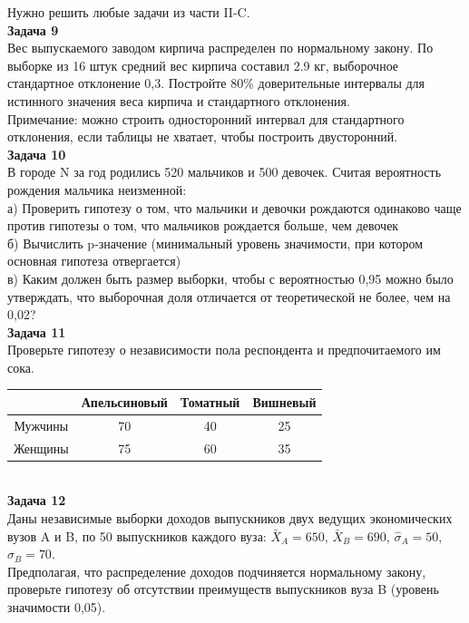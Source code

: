 \documentclass[12pt, a4paper]{article}\usepackage[]{graphicx}\usepackage[]{color}
\begin{document}
Нужно решить любые \textbf{} задачи из части II-C. \\


\textbf{Задача 9} \\
Вес выпускаемого заводом кирпича распределен по нормальному закону. По выборке из 16 штук средний вес кирпича составил 2.9 кг, выборочное стандартное отклонение 0,3. Постройте 80\% доверительные интервалы для истинного значения веса кирпича и стандартного отклонения. \\
Примечание: можно строить односторонний интервал для стандартного отклонения, если таблицы не хватает, чтобы построить двусторонний. \\

\textbf{Задача 10} \\
В городе N за год родились 520 мальчиков и 500 девочек. Считая вероятность рождения мальчика неизменной: \\
а) Проверить гипотезу о том, что мальчики и девочки рождаются одинаково чаще против гипотезы о том, что мальчиков рождается больше, чем девочек \\
б) Вычислить p-значение (минимальный уровень значимости, при котором основная гипотеза отвергается) \\
в) Каким должен быть размер выборки, чтобы с вероятностью 0,95 можно было утверждать, что выборочная доля отличается от теоретической не более, чем на 0,02? \\


\textbf{Задача 11} \\
Проверьте гипотезу о независимости пола респондента и предпочитаемого им сока. \\
\begin{tabular}{|c|c|c|c|}
  \hline
   & Апельсиновый & Томатный & Вишневый  \\
  \hline
  Мужчины & 70 & 40 & 25  \\
  Женщины & 75 & 60 & 35  \\
  \hline
\end{tabular} \\

\textbf{Задача 12} \\
Даны независимые выборки доходов выпускников двух ведущих экономических вузов A и B, по 50 выпускников каждого вуза: $\bar{X}_{A}=650$, $\bar{X}_{B}=690$, $\hat{\sigma}_{A}=50$, $\hat{\sigma}_{B}=70$. \\ Предполагая, что распределение доходов подчиняется нормальному закону, проверьте гипотезу об отсутствии преимуществ выпускников вуза B (уровень значимости 0,05). \\
\end{document}
